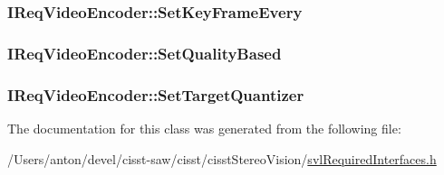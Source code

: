 \subsubsection[{Set\+Key\+Frame\+Every}]{ I\+Req\+Video\+Encoder\+::\+Set\+Key\+Frame\+Every}\label{class_i_req_video_encoder_a1e9188a979450ad1c3d71be5ad90dd2f}
\hypertarget{class_i_req_video_encoder_a1504d33fbcfbea1d10f206106da74868}{}
\subsubsection[{Set\+Quality\+Based}]{ I\+Req\+Video\+Encoder\+::\+Set\+Quality\+Based}\label{class_i_req_video_encoder_a1504d33fbcfbea1d10f206106da74868}
\hypertarget{class_i_req_video_encoder_a5178233369b251350c538a239477f859}{}
\subsubsection[{Set\+Target\+Quantizer}]{ I\+Req\+Video\+Encoder\+::\+Set\+Target\+Quantizer}\label{class_i_req_video_encoder_a5178233369b251350c538a239477f859}


The documentation for this class was generated from the following file\+:\begin{DoxyCompactItemize}
\item 
/\+Users/anton/devel/cisst-\/saw/cisst/cisst\+Stereo\+Vision/\hyperlink{svl_required_interfaces_8h}{svl\+Required\+Interfaces.\+h}\end{DoxyCompactItemize}

